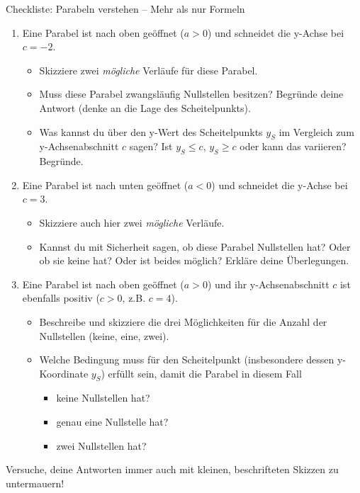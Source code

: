 \begin{aufgabenumgebung}{Checkliste: Parabeln verstehen – Mehr als nur Formeln}
\begin{enumerate}[label=\textbf{Teil \arabic*:}]
    \begin{enumerate}[label=(\alph*)]
        \item Eine Parabel ist nach oben geöffnet ($a > 0$) und schneidet die y-Achse bei $c = -2$.
        \begin{itemize}
            \item Skizziere zwei \textit{mögliche} Verläufe für diese Parabel.
            \item Muss diese Parabel zwangsläufig Nullstellen besitzen? Begründe deine Antwort (denke an die Lage des Scheitelpunkts).
            \item Was kannst du über den y-Wert des Scheitelpunkts $y_S$ im Vergleich zum y-Achsenabschnitt $c$ sagen? Ist $y_S \leq c$, $y_S \geq c$ oder kann das variieren? Begründe.
        \end{itemize}
        \item Eine Parabel ist nach unten geöffnet ($a < 0$) und schneidet die y-Achse bei $c = 3$.
        \begin{itemize}
            \item Skizziere auch hier zwei \textit{mögliche} Verläufe.
            \item Kannst du mit Sicherheit sagen, ob diese Parabel Nullstellen hat? Oder ob sie keine hat? Oder ist beides möglich? Erkläre deine Überlegungen.
        \end{itemize}
        \item Eine Parabel ist nach oben geöffnet ($a > 0$) und ihr y-Achsenabschnitt $c$ ist ebenfalls positiv ($c > 0$, z.B. $c=4$).
        \begin{itemize}
            \item Beschreibe und skizziere die drei Möglichkeiten für die Anzahl der Nullstellen (keine, eine, zwei).
            \item Welche Bedingung muss für den Scheitelpunkt (insbesondere dessen y-Koordinate $y_S$) erfüllt sein, damit die Parabel in diesem Fall
            \begin{itemize}
                \item keine Nullstellen hat?
                \item genau eine Nullstelle hat?
                \item zwei Nullstellen hat?
            \end{itemize}
        \end{itemize}
    \end{enumerate}
\end{enumerate}
Versuche, deine Antworten immer auch mit kleinen, beschrifteten Skizzen zu untermauern!
\end{aufgabenumgebung}

